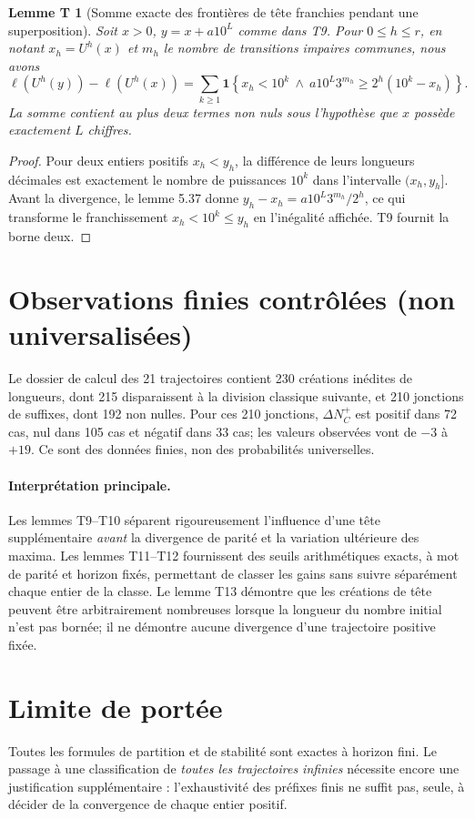 \documentclass[11pt,a4paper]{article}
\newtheorem{lemmet}{Lemme T}
\newcommand{\ellg}{\ell}
\newcommand{\UU}{U}
\begin{document}
\begin{lemmet}[Somme exacte des frontières de tête franchies pendant une superposition]
Soit $x>0$, $y=x+a10^L$ comme dans T9. Pour $0\le h\le r$, en notant $x_h=\UU^h(x)$ et $m_h$ le nombre de transitions impaires communes, nous avons
\[
\boxed{
\ellg(\UU^h(y))-\ellg(\UU^h(x))
=\sum_{k\ge1}
\mathbf 1\!\left\{x_h<10^k\ \land\
 a10^L3^{m_h}\ge2^h(10^k-x_h)\right\}.}
\]
La somme contient au plus deux termes non nuls sous l'hypothèse que $x$ possède exactement $L$ chiffres.
\end{lemmet}
\begin{proof}
Pour deux entiers positifs $x_h<y_h$, la différence de leurs longueurs décimales est exactement le nombre de puissances $10^k$ dans l'intervalle $(x_h,y_h]$. Avant la divergence, le lemme 5.37 donne $y_h-x_h=a10^L3^{m_h}/2^h$, ce qui transforme le franchissement $x_h<10^k\le y_h$ en l'inégalité affichée. T9 fournit la borne deux.
\end{proof}

\section*{Observations finies contrôlées (non universalisées)}
Le dossier de calcul des 21 trajectoires contient 230 créations inédites de longueurs, dont 215 disparaissent à la division classique suivante, et 210 jonctions de suffixes, dont 192 non nulles. Pour ces 210 jonctions, $\Delta N_C^+$ est positif dans 72 cas, nul dans 105 cas et négatif dans 33 cas; les valeurs observées vont de $-3$ à $+19$. Ce sont des données finies, non des probabilités universelles.

\paragraph{Interprétation principale.}
Les lemmes T9--T10 séparent rigoureusement l'influence d'une tête supplémentaire \emph{avant} la divergence de parité et la variation ultérieure des maxima. Les lemmes T11--T12 fournissent des seuils arithmétiques exacts, à mot de parité et horizon fixés, permettant de classer les gains sans suivre séparément chaque entier de la classe. Le lemme T13 démontre que les créations de tête peuvent être arbitrairement nombreuses lorsque la longueur du nombre initial n'est pas bornée; il ne démontre aucune divergence d'une trajectoire positive fixée.

\section*{Limite de portée}
Toutes les formules de partition et de stabilité sont exactes à horizon fini. Le passage à une classification de \emph{toutes les trajectoires infinies} nécessite encore une justification supplémentaire : l'exhaustivité des préfixes finis ne suffit pas, seule, à décider de la convergence de chaque entier positif.
\end{document}
